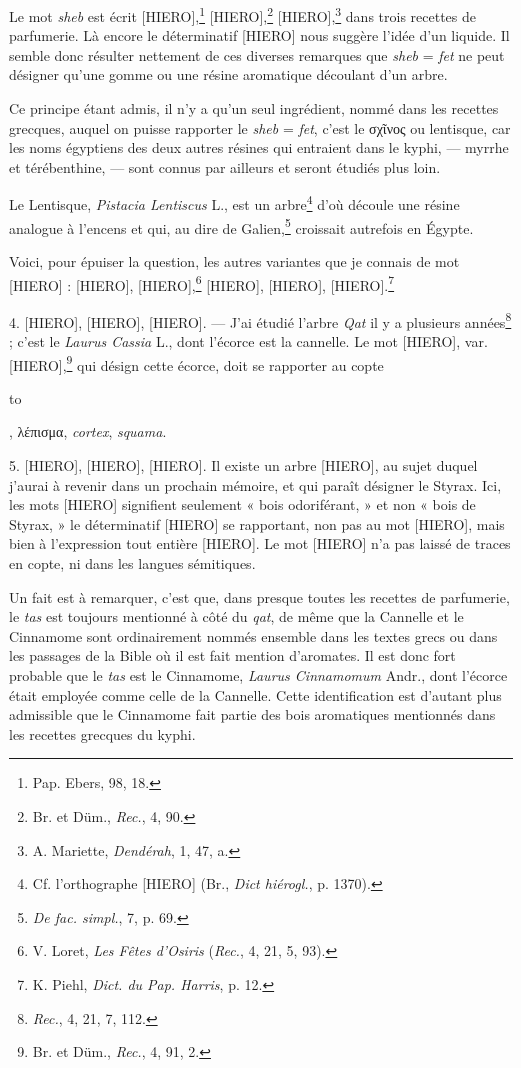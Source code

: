 \documentclass[a4paper, 11pt, oneside]{article}
\begin{document}
Le mot \emph{sheb} est écrit [HIERO],\footnote{Pap. Ebers, 98, 18.} [HIERO],\footnote{Br. et Düm., \emph{Rec.}, 4, 90.} [HIERO],\footnote{A. Mariette, \emph{Dendérah}, 1, 47, a.} dans trois recettes de parfumerie. Là encore le déterminatif [HIERO] nous suggère l'idée d'un liquide. Il semble donc résulter nettement de ces diverses remarques que \emph{sheb} = \emph{fet} ne peut désigner qu'une gomme ou une résine aromatique découlant d'un arbre.

Ce principe étant admis, il n'y a qu'un seul ingrédient, nommé dans les recettes grecques, auquel on puisse rapporter le \emph{sheb} = \emph{fet}, c'est le σχῖνος ou lentisque, car les noms égyptiens des deux autres résines qui entraient dans le kyphi, --- myrrhe et térébenthine, --- sont connus par ailleurs et seront étudiés plus loin.

Le Lentisque, \emph{Pistacia Lentiscus} L., est un arbre\footnote{Cf. l'orthographe [HIERO] (Br., \emph{Dict hiérogl.}, p. 1370).} d'où découle une résine analogue à l'encens et qui, au dire de Galien,\footnote{\emph{De fac. simpl.}, 7, p. 69.} croissait autrefois en Égypte.

Voici, pour épuiser la question, les autres variantes que je connais de mot [HIERO] : [HIERO], [HIERO],\footnote{V. Loret, \emph{Les Fêtes d'Osiris} (\emph{Rec.}, 4, 21, 5, 93).} [HIERO], [HIERO], [HIERO].\footnote{K. Piehl, \emph{Dict. du Pap. Harris}, p. 12.}

4. [HIERO], [HIERO], [HIERO]. --- J'ai étudié l'arbre \emph{Qat} il y a plusieurs années\footnote{\emph{Rec.}, 4, 21, 7, 112.} ; c'est le \emph{Laurus Cassia} L., dont l'écorce est la cannelle. Le mot [HIERO], var. [HIERO],\footnote{Br. et Düm., \emph{Rec.}, 4, 91, 2.} qui désign cette écorce, doit se rapporter au copte \begin{coptic}to\end{coptic}, λέπισμα, \emph{cortex}, \emph{squama}.

5. [HIERO], [HIERO], [HIERO]. Il existe un arbre [HIERO], au sujet duquel j'aurai à revenir dans un prochain mémoire, et qui paraît désigner le Styrax. Ici, les mots [HIERO] signifient seulement « bois odoriférant, » et non « bois de Styrax, » le déterminatif [HIERO] se rapportant, non pas au mot [HIERO], mais bien à l'expression tout entière [HIERO]. Le mot [HIERO] n'a pas laissé de traces en copte, ni dans les langues sémitiques.

Un fait est à remarquer, c'est que, dans presque toutes les recettes de parfumerie, le \emph{tas} est toujours mentionné à côté du \emph{qat}, de même que la Cannelle et le Cinnamome sont ordinairement nommés ensemble dans les textes grecs ou dans les passages de la Bible où il est fait mention d'aromates. Il est donc fort probable que le \emph{tas} est le Cinnamome, \emph{Laurus Cinnamomum} Andr., dont l'écorce était employée comme celle de la Cannelle. Cette identification est d'autant plus admissible que le Cinnamome fait partie des bois aromatiques mentionnés dans les recettes grecques du kyphi.
\end{document}
